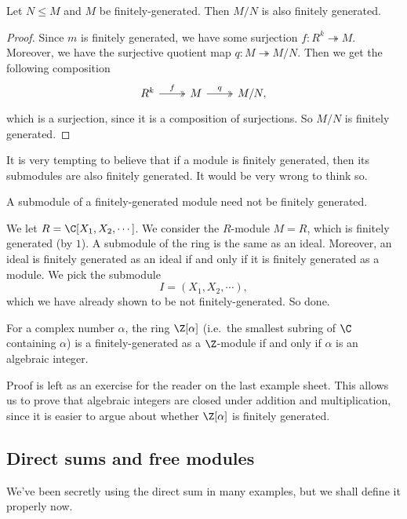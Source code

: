 \documentclass[a4paper]{article}
\begin{document}
\begin{cor}
  Let $N \leq M$ and $M$ be finitely-generated. Then $M/N$ is also finitely generated.
\end{cor}

\begin{proof}
  Since $m$ is finitely generated, we have some surjection $f: R^k \twoheadrightarrow M$. Moreover, we have the surjective quotient map $q: M \twoheadrightarrow M/N$. Then we get the following composition
  \[
    \begin{tikzcd}
      R^k \ar[r, "f", two heads] & M \ar[r, "q", two heads] & M/N,
    \end{tikzcd}
  \]
  which is a surjection, since it is a composition of surjections. So $M/N$ is finitely generated.
\end{proof}

It is very tempting to believe that if a module is finitely generated, then its submodules are also finitely generated. It would be very wrong to think so.

\begin{eg}
  A submodule of a finitely-generated module need not be finitely generated.

  We let $R = \C[X_1, X_2, \cdots]$. We consider the $R$-module $M = R$, which is finitely generated (by $1$). A submodule of the ring is the same as an ideal. Moreover, an ideal is finitely generated as an ideal if and only if it is finitely generated as a module. We pick the submodule
  \[
    I = (X_1, X_2, \cdots),
  \]
  which we have already shown to be not finitely-generated. So done.
\end{eg}

\begin{eg}
  For a complex number $\alpha$, the ring $\Z[\alpha]$ (i.e.\ the smallest subring of $\C$ containing $\alpha$) is a finitely-generated as a $\Z$-module if and only if $\alpha$ is an algebraic integer.

  Proof is left as an exercise for the reader on the last example sheet. This allows us to prove that algebraic integers are closed under addition and multiplication, since it is easier to argue about whether $\Z[\alpha]$ is finitely generated.
\end{eg}

\subsection{Direct sums and free modules}
We've been secretly using the direct sum in many examples, but we shall define it properly now.
\end{document}
